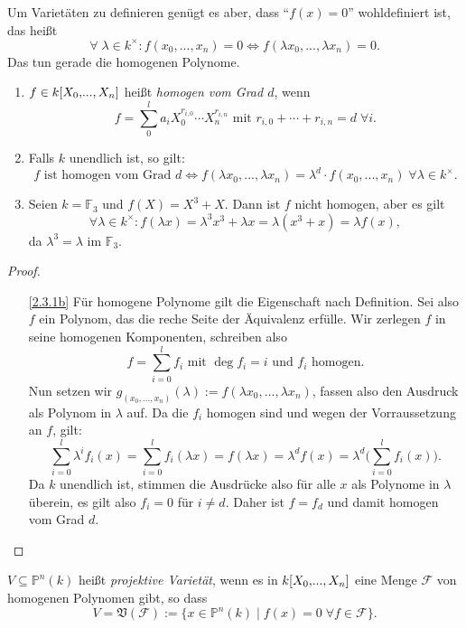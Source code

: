 \documentclass[a4paper,12pt]{scrbook}
\theoremstyle{keinenummern} %
\theoremstyle{mitnummern}
\theoremstyle{unserbeweis}
\newtheorem{proof}{Beweis}
\def\V{\mathfrak{V}}
\def\P{\mathbb{P}}
\newcommand{\F}{\mathcal{F}}
\newcommand{\FF}{\mathbb{F}}
\renewcommand{\dotsc}{\ensuremath{\!...}}
\newcommand{\ppolyx}[1][n]{\ensuremath%
  [X_{0},\dotsc,X_{#1}]}
\begin{document}
Um Varietäten zu definieren genügt es aber, dass \enquote{$f(x)=0$} wohldefiniert ist, das heißt
\[\forall\;\lambda\in k^{\times}\colon  f(x_{0},\dotsc,x_{n})=0\iff f(\lambda x_{0},\dotsc,\lambda x_{n})=0.\]
Das tun gerade die homogenen Polynome.

\begin{erinnerung}\label{2.3.1}\begin{enumerate}
\item{} $f\in k\ppolyx$ heißt \emph{homogen vom Grad $d$}, wenn
\[f=\sum_{0}^{l}a_{i}X_{0}^{r_{i,0}}\dotsm X_{n}^{r_{i,n}}\text{ mit }r_{i,0}+\dotsm+r_{i,n}=d\;\forall i.\]
\item{} Falls $k$ unendlich ist, so gilt:
\[f\text{ ist homogen vom Grad }d\iff f(\lambda x_{0},\dotsc,\lambda x_{n}) = \lambda^{d}\cdot f(x_{0},\dotsc,x_{n})\;\forall\lambda\in k^{\times}.\]
\item{} Seien $k=\FF_{3}$ und $f(X)=X^{3}+X$. Dann ist $f$ nicht homogen, aber es gilt
\[\forall\lambda\in k^{\times}\colon  f(\lambda x)=\lambda^{3}x^{3}+\lambda x=\lambda(x^{3}+x)=\lambda f(x),\]
da $\lambda^{3}=\lambda$ im $\FF_{3}$.
\end{enumerate}\end{erinnerung}
\begin{proof}\begin{enumerate}
\item[\ref{2.3.1b}] Für homogene Polynome gilt die Eigenschaft nach Definition. Sei also $f$ ein Polynom, das die reche Seite der Äquivalenz erfülle. Wir zerlegen $f$ in seine homogenen Komponenten, schreiben also
\[f=\sum_{i=0}^{l}f_{i}\text{ mit }\deg{f_{i}}=i\text{ und }f_{i}\text{ homogen.}\]
Nun setzen wir $g_{(x_{0},\dotsc,x_{n})}(\lambda):=f(\lambda x_{0},\dotsc,\lambda x_{n})$, fassen also den Ausdruck als Polynom in $\lambda$ auf. Da die $f_{i}$ homogen sind und wegen der Vorraussetzung an $f$, gilt:\vspace*{-10pt}
\[\sum_{i=0}^{l}\lambda^{i}f_{i}(x) = \sum_{i=0}^{l}f_{i}(\lambda x) = f(\lambda x)=\lambda^{d}f(x) = \lambda^{d}\biggl(\sum_{i=0}^{l}f_{i}(x)\biggr).\]
Da $k$ unendlich ist, stimmen die Ausdrücke also für alle $x$ als Polynome in $\lambda$ überein, es gilt also $f_{i}=0$ für $i\neq d$. Daher ist $f=f_{d}$ und damit homogen vom Grad $d$.
\end{enumerate}\end{proof}

\begin{dfn}\label{2.3.2}
$V\subseteq\P^{n}(k)$ heißt \emph{projektive Varietät}, wenn es in $k\ppolyx$ eine Menge $\F$ von homogenen Polynomen gibt, so dass
\[V=\V(\F):=\{x\in\P^{n}(k)\mid f(x)=0\;\forall f\in\F\}.\]
\end{dfn}
\end{document}
